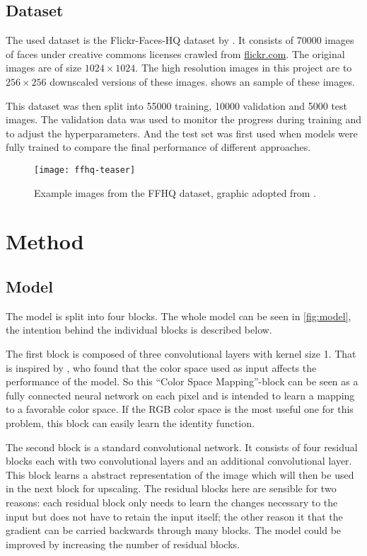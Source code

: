\documentclass{scrartcl}
\begin{document}
\subsection{Dataset}

The used dataset is the Flickr-Faces-HQ dataset by \textcite{style_gan}.
It consists of \num{70000} images of faces under creative commons licenses crawled from \href{https://www.flickr.com}{flickr.com}.
The original images are of size \( \num{1024} \times \num{1024} \).
The high resolution images in this project are to \( \num{256} \times \num{256} \) downscaled versions of these images.
 shows an sample of these images.

This dataset was then split into \num{55000} training, \num{10000} validation and \num{5000} test images.
The validation data was used to monitor the progress during training and to adjust the hyperparameters.
And the test set was first used when models were fully trained to compare the final performance of different approaches.

\begin{figure}
	\centering
	\texttt{[image: ffhq-teaser]}
	\caption{Example images from the FFHQ dataset, graphic adopted from \textcite{style_gan}.}
	\label{fig:ffhq-teaser}
\end{figure} 

\section{Method}

\subsection{Model}
The model is split into four blocks. The whole model can be seen in \cref{fig:model}, the intention behind the individual blocks is described below.

The first block is composed of three convolutional layers with kernel size 1.
That is inspired by \textcite{color_net}, who found that the color space used as input affects the performance of the model.  
So this \enquote{Color Space Mapping}-block can be seen as a fully connected neural network on each pixel and is intended to learn a mapping to a favorable color space.
If the RGB color space is the most useful one for this problem, this block can easily learn the identity function.

The second block is a standard convolutional network.
It consists of four residual blocks each with two convolutional layers and an additional convolutional layer.
This block learns a abstract representation of the image which will then be used in the next block for upscaling.
The residual blocks here are sensible for two reasons: each residual block only needs to learn the changes necessary to the input but does not have to retain the input itself; the other reason it that the gradient can be carried backwards through many blocks.
The model could be improved by increasing the number of residual blocks.
\end{document}
